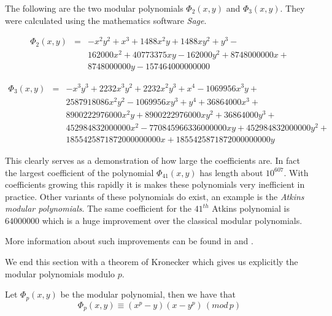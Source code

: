 \begin{ex}
 The following are the two modular polynomials $\Phi_2(x,y)$ and $\Phi_3(x,y)$. They were
calculated using the mathematics software \emph{Sage}. 

\begin{eqnarray}
 \Phi_2(x,y) &=& -x^2y^2 + x^3 + 1488x^2y + 1488xy^2 + y^3 -\nonumber \\
	      && 162000x^2 + 40773375xy - 162000y^2 + 8748000000x +\nonumber \\
	      && 8748000000y - 157464000000000 \nonumber
\end{eqnarray}

\begin{eqnarray}
  \Phi_3(x,y) &=& -x^3y^3 + 2232x^3y^2 + 2232x^2y^3 + x^4 - 1069956x^3y +\nonumber \\
	      &&  2587918086x^2y^2-1069956xy^3 + y^4 + 36864000x^3 + \nonumber \\ 
	      &&  8900222976000x^2y + 8900222976000xy^2+36864000y^3 +\nonumber \\
	      &&  452984832000000x^2 - 770845966336000000xy + 452984832000000y^2+\nonumber \\
	      &&  1855425871872000000000x + 1855425871872000000000y \nonumber
\end{eqnarray}

This clearly serves as a demonstration of how large the coefficients are. In fact the largest
coefficient of the polynomial $\Phi_{41}(x,y)$ has length about $10^{607}$. With coefficients growing this
rapidly it is makes these polynomials very inefficient in practice. Other variants of these polynomials
do exist, an example is the \emph{Atkins modular polynomials}. The same coefficient for the $41^{th}$ Atkins
polynomial is $64000000$ which is a huge improvement over the classical modular polynomials.

More information about such improvements can be found in \cite{Handbook} and \cite{Blake}.
\end{ex}


We end this section with a theorem of Kronecker which gives us explicitly the modular polynomials
modulo $p$.
\begin{thm} \label{kroenecker}
 Let $\Phi_p(x,y)$ be the modular polynomial, then we have that
$$ \Phi_p(x,y) \equiv (x^p-y)(x-y^p)\,(mod\,p)$$
\end{thm}
